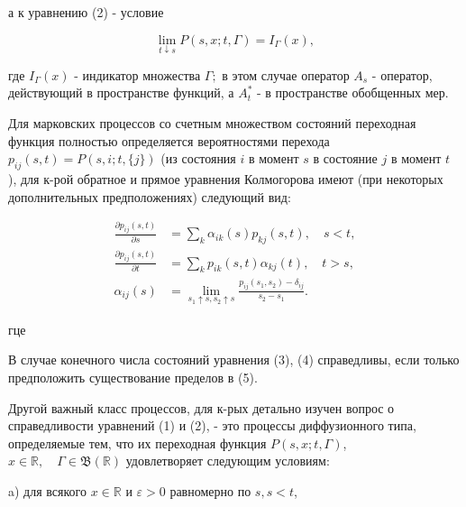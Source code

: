 \documentclass[10pt]{article}
\begin{document}
а к уравнению (2) - условие



\[

\lim _{t \downarrow s} P(s, x ; t, \Gamma)=I_{\Gamma}(x),

\]



где $I_{\Gamma}(x)$ - индикатор множества $\Gamma ;$ в этом случае оператор $A_{s}$ - оператор, действующий в пространстве функций, а $A_{t}^{*}$ - в пространстве обобщенных мер.



Для марковских процессов со счетным множеством состояний переходная функция полностью определяется вероятностями перехода $p_{i j}(s, t)=P(s, i ; t,\{j\})$ (из состояния $i$ в момент $s$ в состояние $j$ в момент $t$ ), для к-рой обратное и прямое уравнения Колмогорова имеют (при некоторых дополнительных предположениях) следующий вид:



\[

\begin{aligned}

\frac{\partial p_{i j}(s, t)}{\partial s} & =\sum_{k} \alpha_{i k}(s) p_{k j}(s, t), \quad s<t, \\

\frac{\partial p_{i j}(s, t)}{\partial t} & =\sum_{k} p_{i k}(s, t) \alpha_{k j}(t), \quad t>s, \\

\alpha_{i j}(s) & =\lim _{s_{1} \uparrow s, s_{2} \uparrow s} \frac{p_{i j}\left(s_{1}, s_{2}\right)-\delta_{i j}}{s_{2}-s_{1}} .

\end{aligned}

\]



гце



В случае конечного числа состояний уравнения (3), (4) справедливы, если только предположить существование пределов в (5).



Другой важный класс процессов, для к-рых детально изучен вопрос о справедливости уравнений (1) и (2), - это процессы диффузионного типа, определяемые тем, что их переходная функция $P(s, x ; t, \Gamma)$, $x \in \mathbb{R}, \quad \Gamma \in \mathfrak{B}(\mathbb{R})$ удовлетворяет следующим условиям:



a) для всякого $x \in \mathbb{R}$ и $\varepsilon>0$ равномерно по $s, s<t$,
\end{document}
